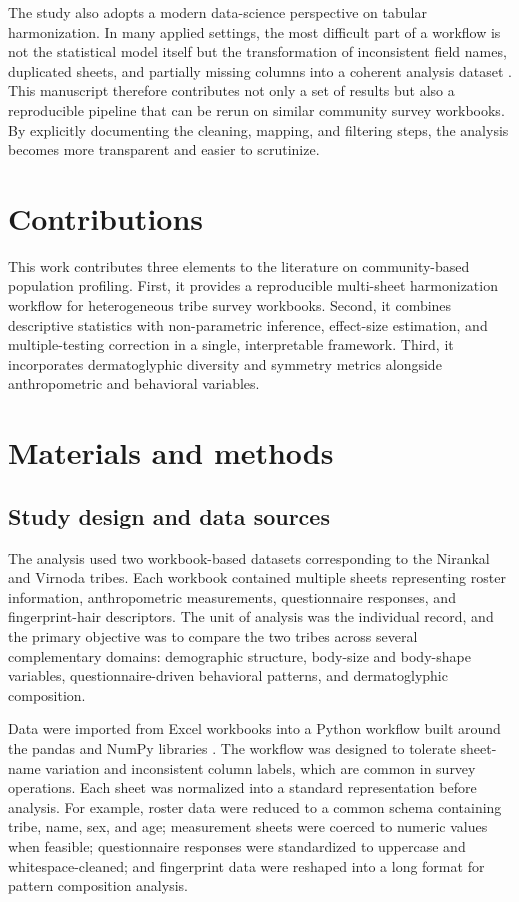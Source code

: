\documentclass[11pt]{article}
\begin{document}
The study also adopts a modern data-science perspective on tabular harmonization. In many applied settings, the most difficult part of a workflow is not the statistical model itself but the transformation of inconsistent field names, duplicated sheets, and partially missing columns into a coherent analysis dataset \cite{mckinney2010,harris2020,virtanen2020,pedregosa2011}. This manuscript therefore contributes not only a set of results but also a reproducible pipeline that can be rerun on similar community survey workbooks. By explicitly documenting the cleaning, mapping, and filtering steps, the analysis becomes more transparent and easier to scrutinize.

\section{Contributions}
This work contributes three elements to the literature on community-based population profiling. First, it provides a reproducible multi-sheet harmonization workflow for heterogeneous tribe survey workbooks. Second, it combines descriptive statistics with non-parametric inference, effect-size estimation, and multiple-testing correction in a single, interpretable framework. Third, it incorporates dermatoglyphic diversity and symmetry metrics alongside anthropometric and behavioral variables.

\section{Materials and methods}
\subsection{Study design and data sources}
The analysis used two workbook-based datasets corresponding to the Nirankal and Virnoda tribes. Each workbook contained multiple sheets representing roster information, anthropometric measurements, questionnaire responses, and fingerprint-hair descriptors. The unit of analysis was the individual record, and the primary objective was to compare the two tribes across several complementary domains: demographic structure, body-size and body-shape variables, questionnaire-driven behavioral patterns, and dermatoglyphic composition.

Data were imported from Excel workbooks into a Python workflow built around the pandas and NumPy libraries \cite{mckinney2010,harris2020}. The workflow was designed to tolerate sheet-name variation and inconsistent column labels, which are common in survey operations. Each sheet was normalized into a standard representation before analysis. For example, roster data were reduced to a common schema containing tribe, name, sex, and age; measurement sheets were coerced to numeric values when feasible; questionnaire responses were standardized to uppercase and whitespace-cleaned; and fingerprint data were reshaped into a long format for pattern composition analysis.
\end{document}
